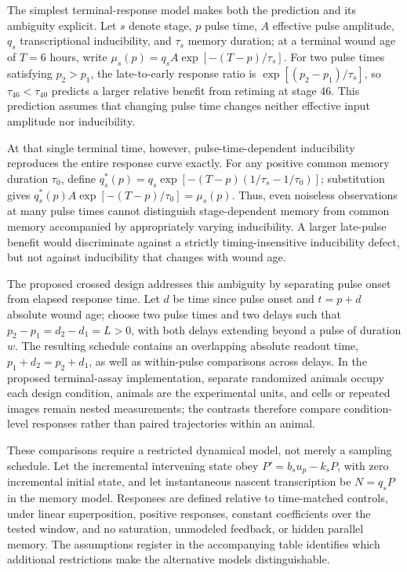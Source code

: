 \documentclass[11pt]{article}
\begin{document}
The simplest terminal-response model makes both the prediction and its ambiguity explicit. Let $s$ denote stage, $p$ pulse time, $A$ effective pulse amplitude, $q_s$ transcriptional inducibility, and $\tau_s$ memory duration; at a terminal wound age of $T=6$ hours, write $\mu_s(p)=q_sA\exp[-(T-p)/\tau_s]$. For two pulse times satisfying $p_2>p_1$, the late-to-early response ratio is $\exp[(p_2-p_1)/\tau_s]$, so $\tau_{46}<\tau_{40}$ predicts a larger relative benefit from retiming at stage 46. This prediction assumes that changing pulse time changes neither effective input amplitude nor inducibility.

At that single terminal time, however, pulse-time-dependent inducibility reproduces the entire response curve exactly. For any positive common memory duration $\tau_0$, define $q_s^*(p)=q_s\exp[-(T-p)(1/\tau_s-1/\tau_0)]$; substitution gives $q_s^*(p)A\exp[-(T-p)/\tau_0]=\mu_s(p)$. Thus, even noiseless observations at many pulse times cannot distinguish stage-dependent memory from common memory accompanied by appropriately varying inducibility. A larger late-pulse benefit would discriminate against a strictly timing-insensitive inducibility defect, but not against inducibility that changes with wound age.

The proposed crossed design addresses this ambiguity by separating pulse onset from elapsed response time. Let $d$ be time since pulse onset and $t=p+d$ absolute wound age; choose two pulse times and two delays such that $p_2-p_1=d_2-d_1=L>0$, with both delays extending beyond a pulse of duration $w$. The resulting schedule contains an overlapping absolute readout time, $p_1+d_2=p_2+d_1$, as well as within-pulse comparisons across delays. In the proposed terminal-assay implementation, separate randomized animals occupy each design condition, animals are the experimental units, and cells or repeated images remain nested measurements; the contrasts therefore compare condition-level responses rather than paired trajectories within an animal.

These comparisons require a restricted dynamical model, not merely a sampling schedule. Let the incremental intervening state obey $P'=b_su_p-k_sP$, with zero incremental initial state, and let instantaneous nascent transcription be $N=q_sP$ in the memory model. Responses are defined relative to time-matched controls, under linear superposition, positive responses, constant coefficients over the tested window, and no saturation, unmodeled feedback, or hidden parallel memory. The assumptions register in the accompanying table identifies which additional restrictions make the alternative models distinguishable.
\end{document}
